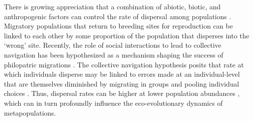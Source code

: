 \documentclass{revtex4}
\begin{document}
There is growing appreciation that a combination of abiotic, biotic, and anthropogenic factors can control the rate of dispersal among populations \citep{Travis:2013en,H:2013fs,Keefer:2014gg,Bett:2017ha}.
Migratory populations that return to breeding sites for reproduction can be linked to each other by some proportion of the population that disperses into the `wrong' site. 
Recently, the role of social interactions to lead to collective navigation has been hypothesized  as a mechanism shaping the success of philopatric migrations \citep{Berdahl:2016dx,HardestyMoore:wg,Berdahl:2017uu}.
The collective navigation hypothesis posits that rate at which individuals disperse may be linked to errors made at an individual-level that are themselves diminished by migrating in groups and pooling individual choices \citep{Simons:2004jo,Berdahl:2016dx,Berdahl:2017uu}.
Thus, dispersal rates can be higher at lower population abundances \citep{Berdahl:2014bl}, which can in turn profoundly influence the eco-evolutionary dynamics of metapopulations. 



\end{document}
